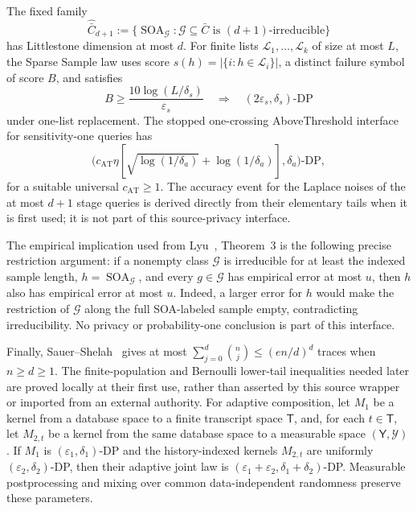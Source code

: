 \begin{proposition}
The fixed family
\[
 \widehat{\bar C}_{d+1}:=
 \{\operatorname{SOA}_{\mathcal G}:\mathcal G\subseteq\bar C
       \text{ is }(d+1)\text{-irreducible}\}
 \tag{C3}
\]
has Littlestone dimension at most \(d\). For finite lists
\(\mathcal L_1,\ldots,\mathcal L_k\) of size at most \(L\), the Sparse
Sample law uses score \(s(h)=|\{i:h\in\mathcal L_i\}|\), a distinct failure
symbol of score \(B\), and satisfies
\[
 B\geq\frac{10\log(L/\delta_s)}{\varepsilon_s}
 \quad\Longrightarrow\quad
 (2\varepsilon_s,\delta_s)\text{-DP}
 \tag{C4}
\]
under one-list replacement. The stopped one-crossing AboveThreshold
interface for sensitivity-one queries has
\[
 \bigl(c_{\mathrm{AT}}\eta
 [\sqrt{\log(1/\delta_a)}+\log(1/\delta_a)],
 \delta_a\bigr)\text{-DP},
 \tag{C5}
\]
for a suitable universal \(c_{\mathrm{AT}}\ge1\). The accuracy event for
the Laplace noises of the at most \(d+1\) stage queries is derived directly
from their elementary tails when it is first used; it is not part of this
source-privacy interface.

The empirical implication used from Lyu~\citep{lyu2025}, Theorem~3 is the
following precise restriction argument: if a nonempty class \(\mathcal G\)
is irreducible for at least the indexed sample length,
\(h=\operatorname{SOA}_{\mathcal G}\), and every \(g\in\mathcal G\) has
empirical error at most \(u\), then \(h\) also has empirical error at most
\(u\). Indeed, a larger error for \(h\) would make the restriction of
\(\mathcal G\) along the full SOA-labeled sample empty, contradicting
irreducibility. No privacy or probability-one conclusion is part of this
interface.

Finally, Sauer--Shelah~\citep{sauer1972} gives at most
\(\sum_{j=0}^d\binom nj\le(en/d)^d\) traces when \(n\ge d\ge1\).
The finite-population and Bernoulli lower-tail inequalities needed later
are proved locally at their first use, rather than asserted by this
source wrapper or imported from an external authority.
For adaptive composition, let \(M_1\) be a kernel from a database space to a finite transcript
space \(\mathsf T\), and, for each \(t\in\mathsf T\), let \(M_{2,t}\) be a
kernel from the same database space to a measurable space
\((\mathsf Y,\mathcal Y)\). If \(M_1\) is
\((\varepsilon_1,\delta_1)\)-DP and the history-indexed kernels
\(M_{2,t}\) are uniformly \((\varepsilon_2,\delta_2)\)-DP, then their
adaptive joint law is
\((\varepsilon_1+\varepsilon_2,\delta_1+\delta_2)\)-DP. Measurable
postprocessing and mixing over common data-independent randomness preserve
these parameters.
\end{proposition}

